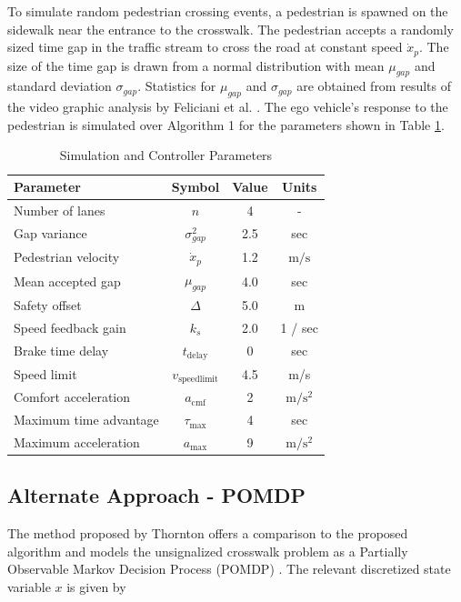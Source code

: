 \documentclass[letterpaper, 10 pt, conference]{ieeeconf} %
\begin{document}
To simulate random pedestrian crossing events, a pedestrian is spawned on the sidewalk near the entrance to the crosswalk. The pedestrian accepts a randomly sized time gap in the traffic stream to cross the road at constant speed $\dot{x}_p$. The size of the time gap is drawn from a normal distribution with mean $\mu_{gap}$ and standard deviation $\sigma_{gap}$. Statistics for $\mu_{gap}$ and $\sigma_{gap}$ are obtained from results of the video graphic analysis by Feliciani et al. \cite{Feliciani2017}. The ego vehicle's response to the pedestrian is simulated over Algorithm 1 for the parameters shown in Table \ref{tb:params}. 

\begin{table}[h]
\begin{center}
\caption{Simulation and Controller Parameters}\label{tb:params}
\begin{tabular}{lccc}
Parameter & Symbol & Value & Units \\\hline\hline
Number of lanes & $n$ & 4 & - \\
Gap variance & $\sigma^2_{gap}$ & 2.5 & sec\\
Pedestrian velocity & $\dot{x}_p$ & 1.2 & $\mathrm{m/s}$ \\
Mean accepted gap & $\mu_{gap}$ & 4.0 & sec\\\hline
Safety offset    & $\Delta$ & 5.0 & m \\
Speed feedback gain & $k_s$ & 2.0 & 1 / sec\\
Brake time delay  & $t_\mathrm{delay}$ & 0 & sec \\ 
Speed limit & $v_\mathrm{speedlimit}$ & 4.5 & m/s \\
Comfort acceleration & $a_\mathrm{cmf}$ & 2 & $\mathrm{m/s^2}$ \\
Maximum time advantage & $\tau_\mathrm{max}$ & 4 & sec \\
Maximum acceleration & $a_\mathrm{max}$ & 9 & $\mathrm{m/s^2}$ \\\hline
\end{tabular}
\end{center}
\end{table}

\subsection{Alternate Approach - POMDP}
The method proposed by Thornton \cite{Thornton2018} offers a comparison to the proposed algorithm and models the unsignalized crosswalk problem as a Partially 
Observable Markov Decision Process (POMDP) \cite{Kochenderfer2015}. The relevant discretized state variable $x$ is given by
\end{document}
